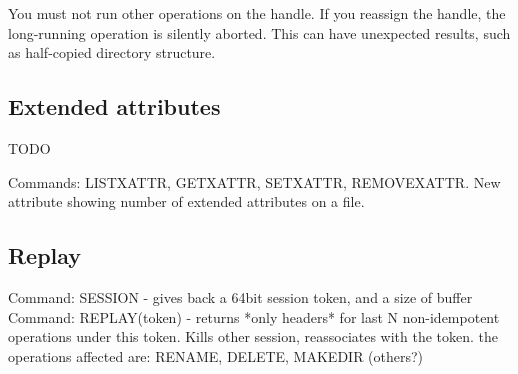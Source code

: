You must not run other operations on the handle. If you reassign the handle, the long-running operation is
silently aborted. This can have unexpected results, such as half-copied directory structure.

\subsection{Extended attributes}

TODO

Commands: LISTXATTR, GETXATTR, SETXATTR, REMOVEXATTR. New attribute showing number of extended attributes on a file.

\subsection{Replay}

Command: SESSION  - gives back a 64bit session token, and a size of buffer
Command: REPLAY(token) - returns *only headers* for last N non-idempotent operations under this token. Kills other session,
reassociates with the token.
the operations affected are: RENAME, DELETE, MAKEDIR (others?)
